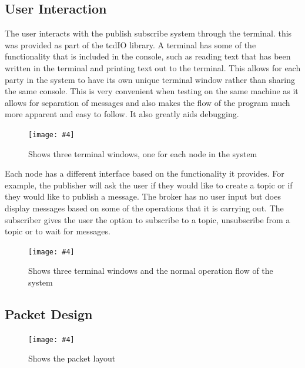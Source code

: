 \documentclass{article}
\newcommand{\includefigure}[4]{
\begin{figure}[htb]
\centering
\texttt{[image: \#4]}
\captionsetup{width=.8\linewidth} 
\caption[#2]{#3}
\label{#1}
\end{figure}
}
\begin{document}
\subsection{User Interaction}

The user interacts with the publish subscribe system through the terminal. this was provided as part of the tcdIO library. A terminal has some of the functionality that is included in the console, such as reading text that has been written in the terminal and printing text out to the terminal. This allows for each party in the system to have its own unique terminal window rather than sharing the same console. This is very convenient when testing on the same machine as it allows for separation of messages and also makes the flow of the program much more apparent and easy to follow. It also greatly aids debugging.
\includefigure{fig:Terminal}{Terminal}{Shows three terminal windows, one for each node in the system}{Terminal-Window.PNG}
\newline
Each node has a different interface based on the functionality it provides. For example, the publisher will ask the user if they would like to create a topic or if they would like to publish a message. The broker has no user input but does display messages based on some of the operations that it is carrying out. The subscriber gives the user the option to subscribe to a topic, unsubscribe from a topic or to wait for messages. 
\pagebreak
\includefigure{fig:NormalOperation}{NormalOperations}{Shows three terminal windows and the normal operation flow of the system}{Normal-Operation.PNG}



\subsection{Packet Design}

\includefigure{fig:PacketLayout}{PacketLayout}{Shows the packet layout}{Packet-Layout.PNG}
\end{document}
